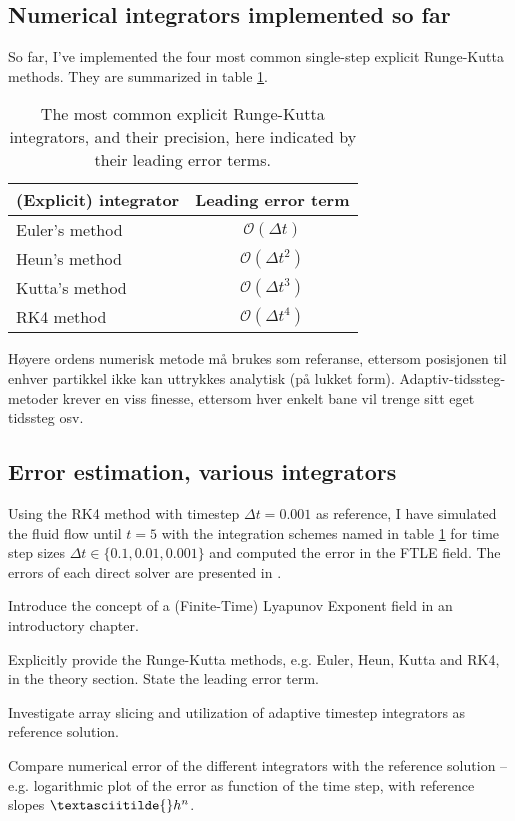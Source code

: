 \subsection{Numerical integrators implemented so far}
\label{sec:initial_numerical_integrators}
So far, I've implemented the four most common single-step explicit
Runge-Kutta methods. They are summarized in table
\ref{tab:initial_explicit_integrators}. 

\begin{table}[h]
  \centering
  \caption{The most common explicit Runge-Kutta integrators, and their
           precision, here indicated by their leading error terms.}
  \label{tab:initial_explicit_integrators}
  \begin{tabular}[h]{l|c}
    \hline
    (Explicit) integrator & Leading error term \\
    \hline
    Euler's method & $\mathcal{O}(\Delta{}t)$ \\
    Heun's method & $\mathcal{O}(\Delta{}t^{2})$ \\
    Kutta's method & $\mathcal{O}(\Delta{}t^{3})$ \\
    RK4 method & $\mathcal{O}(\Delta{}t^{4})$ \\
    \hline
  \end{tabular}
\end{table}



Høyere ordens numerisk metode må brukes som referanse, ettersom
posisjonen til enhver partikkel ikke kan uttrykkes analytisk (på lukket
form). Adaptiv-tidssteg-metoder krever en viss finesse, ettersom hver
enkelt bane vil trenge sitt eget tidssteg osv.




\subsection{Error estimation, various integrators}

Using the RK4 method with timestep $\Delta{}t=0.001$ as reference, I
have simulated the fluid flow until $t=5$ with the integration schemes
named in table \ref{tab:initial_explicit_integrators} for time step
sizes $\Delta{}t\in\{0.1,0.01,0.001\}$ and computed the error in the
FTLE field. The errors of each direct solver are presented in
. 

\begin{tcolorbox}
  Introduce the concept of a (Finite-Time) Lyapunov Exponent field
  in an introductory chapter.

  Explicitly provide the Runge-Kutta methods, e.g. Euler, Heun, Kutta
  and RK4, in the theory section. State the leading error term.

  Investigate array slicing and utilization of adaptive timestep
  integrators as reference solution.

  Compare numerical error of the different integrators with the
  reference solution -- e.g. logarithmic plot of the error as function
  of the time step, with reference slopes $\textasciitilde{}h^{n}$.
\end{tcolorbox}

